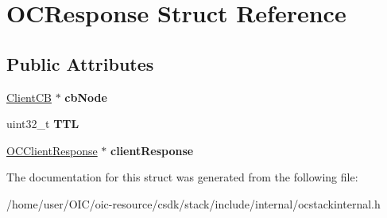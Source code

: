 \hypertarget{structOCResponse}{}\section{O\+C\+Response Struct Reference}
\label{structOCResponse}
\subsection*{Public Attributes}
\begin{DoxyCompactItemize}
\item 
\hypertarget{structOCResponse_a468e3d857bf47816f70b87e487c91e7e}{}\hyperlink{structClientCB}{Client\+C\+B} $\ast$ {\bfseries cb\+Node}\label{structOCResponse_a468e3d857bf47816f70b87e487c91e7e}

\item 
\hypertarget{structOCResponse_a25d4ff7a51f5bf424f017d1d44f5774c}{}uint32\+\_\+t {\bfseries T\+T\+L}\label{structOCResponse_a25d4ff7a51f5bf424f017d1d44f5774c}

\item 
\hypertarget{structOCResponse_ad2e5d6958e3d56c17d147fcd0b56b010}{}\hyperlink{structOCClientResponse}{O\+C\+Client\+Response} $\ast$ {\bfseries client\+Response}\label{structOCResponse_ad2e5d6958e3d56c17d147fcd0b56b010}

\end{DoxyCompactItemize}


The documentation for this struct was generated from the following file\+:\begin{DoxyCompactItemize}
\item 
/home/user/\+O\+I\+C/oic-\/resource/csdk/stack/include/internal/ocstackinternal.\+h\end{DoxyCompactItemize}
